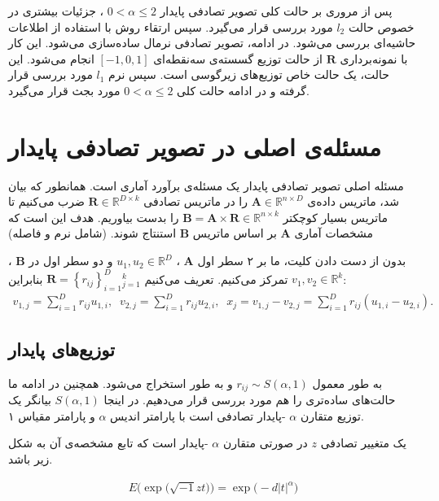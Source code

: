 پس از مروری بر حالت کلی تصویر تصادفی پایدار 
$0 < \alpha \leq 2$
، جزئیات بیشتری در خصوص حالت 
$l_2$
مورد بررسی قرار می‌گیرد. سپس ارتقاء روش با استفاده از اطلاعات حاشیه‌ای
بررسی می‌شود. در ادامه، تصویر تصادفی نرمال ساده‌سازی می‌شود. این کار با نمونه‌برداری 
$\mathbf{R}$
از حالت توزیع گسسته‌ی سه‌نقطه‌ای 
$[ -1, 0, 1]$
انجام می‌شود. این حالت، یک حالت خاص توزیع‌های زیرگوسی
است. سپس نرم 
$l_1$
مورد بررسی قرار گرفته و در ادامه حالت کلی 
$0 < \alpha \leq 2$
مورد بجث قرار می‌گیرد.

\section{
مسئله‌ی اصلی در تصویر تصادفی پایدار
}
مسئله اصلی تصویر تصادفی پایدار یک مسئله‌ی برآورد آماری است. همانطور که بیان شد، ماتریس داده‌ی 
$\mathbf{A} \in \mathbb{R}^{n \times D}$
را در ماتریس تصادفی 
$\mathbf{R} \in \mathbb{R}^{D \times k}$
ضرب می‌کنیم تا ماتریس بسیار کوچکتر 
$\mathbf{B} = \mathbf{A} \times \mathbf{R} \in \mathbb{R}^{n \times k}$
را بدست بیاوریم. هدف این است که مشخصات آماری 
$\mathbf{A}$
بر اساس ماتریس 
$\mathbf{B}$
استنتاج شوند. (شامل نرم و فاصله)

بدون از دست دادن کلیت، ما بر ۲ سطر اول 
$\mathbf{A}$
، 
$u_1, u_2 \in \mathbb{R}^D$
و دو سطر اول در 
$\mathbf{B}$
،
$v_1, v_2 \in \mathbb{R}^k$
تمرکز می‌کنیم. تعریف می‌کنیم
$ \mathbf{R} = \left \{ r_{ij} \right \}_{i=1}^D {}_{j=1}^{k}$
بنابراین:
\begin{align}
v_{1,j} = \sum_{i=1}^{D} r_{ij}u_{1,i},\;\;
v_{2,j} = \sum_{i=1}^{D} r_{ij}u_{2,i},\;\;
x_j = v_{1,j} - v_{2,j} = \sum_{i=1}^D r_{ij}(u_{1,i} - u_{2,i}).
\label{eq:1hm}
\end{align}

\subsection{
توزیع‌های پایدار
}

به طور معمول 
$r_{ij} \sim S(\alpha, 1)$
 و به طور 
استخراج می‌شود. همچنین در ادامه ما حالت‌های ساده‌تری را هم مورد بررسی قرار می‌دهیم. در اینجا 
$S(\alpha, 1)$
بیانگر یک توزیع متقارن 
$\alpha$
-پایدار تصادفی است
\cite{litez171}
با پارامتر اندیس 
$\alpha$
و پارامتر مقیاس ۱.

یک متغییر تصادفی 
$z$
در صورتی متقارن  
$\alpha$
-پایدار است که تابع مشخصه‌ی آن به شکل زیر باشد.

\begin{align}
E \big( \exp  \big( \sqrt{-1}zt \big)  \big) = \exp \big( -d |t|^\alpha \big)
\label{eq:1hn}
\end{align}

